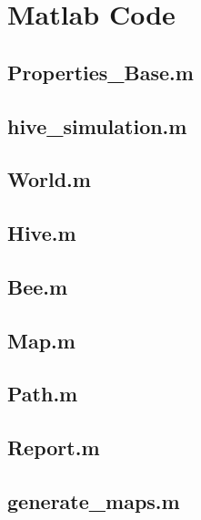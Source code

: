 \section{Matlab Code}
\subsection{Properties\_Base.m}
\label{chap:MATLAB_Base}

\subsection{hive\_simulation.m}
\label{chap:MATLAB_hive_simulation}

\subsection{World.m}
\label{chap:MATLAB_World}

\subsection{Hive.m}
\label{chap:MATLAB_Hive}

\subsection{Bee.m}
\label{chap:MATLAB_Bee}

\subsection{Map.m}
\label{chap:MATLAB_Map}

\subsection{Path.m}
\label{chap:MATLAB_Path}

\subsection{Report.m}
\label{chap:MATLAB_Report}

\subsection{generate\_maps.m}
\label{chap:MATLAB_generate_maps}

